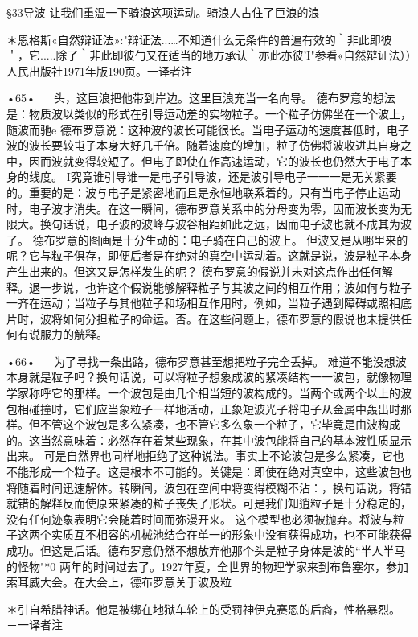 §33导波
让我们重温一下骑浪这项运动。骑浪人占住了巨浪的浪

＊恩格斯«自然辩证法»:"辩证法...…不知道什么无条件的普遍有效的｀非此即彼＇，它.....除了｀非此即彼勹又在适当的地方承认｀亦此亦彼'I"参看«自然辩证法））人民出版社1971年版190页。一译者注

•65•
  
头，这巨浪把他带到岸边。这里巨浪充当一名向导。
德布罗意的想法是：物质波以类似的形式在引导运动羞的实物粒子。一个粒子仿佛坐在一个波上，随波而驰e
德布罗意说：这种波的波长可能很长。当电子运动的速度甚低时，电子波的波长要较屯子本身大好几千倍。随着速度的增加，粒子仿佛将波收进其自身之中，因而波就变得较短了。但电子即使在作高速运动，它的波长也仍然大于电子本身的线度。
I究竟谁引导谁一是电子引导波，还是波引导电子一一一是无关紧要的。重要的是：波与电子是紧密地而且是永恒地联系着的。只有当电子停止运动时，电子波才消失。在这一瞬间，德布罗意关系中的分母变为零，因而波长变为无限大。换句话说，电子波的波峰与波谷相距如此之远，因而电子波也就不成其为波了。
德布罗意的图画是十分生动的：电子骑在自己的波上。
但波又是从哪里来的呢？它与粒子俱存，即便后者是在绝对的真空中运动着。这就是说，波是粒子本身产生出来的。但这又是怎样发生的呢？
德布罗意的假说并未对这点作出任何解释。退一步说，也许这个假说能够解释粒子与其波之间的相互作用；波如何与粒子一齐在运动；当粒子与其他粒子和场相互作用时，例如，当粒子遇到障碍或照相底片时，波将如何分担粒子的命运。否。在这些问题上，德布罗意的假说也未提供任何有说服力的觥释。

•66•
  
为了寻找一条出路，德布罗意甚至想把粒子完全丢掉。
难道不能没想波本身就是粒子吗？换句话说，可以将粒子想象成波的紧凑结构一一波包，就像物理学家称呼它的那样。一个波包是由几个相当短的波构成的。当两个或两个以上的波包相碰撞时，它们应当象粒子一样地活动，正象短波光子将电子从金属中轰出时那样。但不管这个波包是多么紧凑，也不管它多么象一个粒子，它毕竟是由波构成的。这当然意味着：必然存在着某些现象，在其中波包能将自己的基本波性质显示出来。
可是自然界也同样地拒绝了这种说法。事实上不论波包是多么紧凑，它也不能形成一个粒子。这是根本不可能的。关键是：即使在绝对真空中，这些波包也将随着时间迅速解体。转瞬间，波包在空间中将变得模糊不沾：，换句话说，将错就错的解释反而使原来紧凑的粒子丧失了形状。可是我们知逍粒子是十分稳定的，没有任何迹象表明它会随着时间而弥漫开来。
这个模型也必须被抛弃。将波与粒子这两个实质互不相容的机械池结合在单一的形象中没有获得成功，也不可能获得成功。但这是后话。德布罗意仍然不想放弃他那个头是粒子身体是波的“半人半马的怪物"*0
两年的时间过去了。1927年夏，全世界的物理学家来到布鲁塞尔，参加索耳威大会。在大会上，德布罗意关于波及粒

＊引自希腊神话。他是被绑在地狱车轮上的受罚神伊克赛恩的后裔，性格暴烈。－－一译者注

